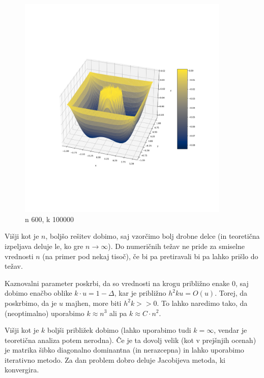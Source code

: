 \documentclass{article}
\begin{document}
    \begin{figure}[h]
        \centering
        \includegraphics[width=0.9\textwidth]{nal1_n600_k100000.png}
        \caption{n 600, k 100000}
    \end{figure}

    Višji kot je \(n\), boljšo rešitev dobimo, saj vzorčimo bolj drobne delce (in teoretična izpeljava deluje le, ko gre \(n\to \infty\)). Do numeričnih težav ne pride za smiselne vrednosti \(n\) (na primer pod nekaj tisoč), če bi pa pretiravali bi pa lahko prišlo do težav.

    Kaznovalni parameter poskrbi, da so vrednosti na krogu približno enake 0, saj dobimo enačbo oblike \(k\cdot u = 1- \Delta \), kar je približno \(h^2 k u = O(u)\). Torej, da poskrbimo, da je \(u\) majhen, more biti \(h^2k>>0\). To lahko naredimo tako, da (neoptimalno) uporabimo \(k\approx n^3\) ali pa \(k\approx C\cdot n^2\).

    Višji kot je \(k\) boljši približek dobimo (lahko uporabimo tudi \(k=\infty\), vendar je teoretična analiza potem nerodna). Če je ta dovolj velik (kot v prejšnjih ocenah) je matrika šibko diagonalno dominantna (in nerazcepna) in lahko uporabimo iterativno metodo. Za dan problem dobro deluje Jacobijeva metoda, ki konvergira. 
\end{document}
